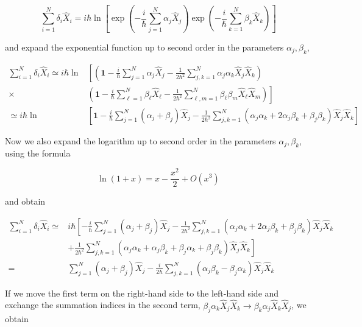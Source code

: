 \documentclass[10pt, letterpaper]{article}
\begin{document}
$$
\sum_{i=1}^{N} \delta_{i} \hat{X}_{i}=i \hbar \ln \left[\exp \left(-\frac{i}{\hbar} \sum_{j=1}^{N} \alpha_{j} \hat{X}_{j}\right) \exp \left(-\frac{i}{\hbar} \sum_{k=1}^{N} \beta_{k} \hat{X}_{k}\right)\right]
$$

and expand the exponential function up to second order in the parameters $\alpha_{j}, \beta_{k}$,

$$
\begin{aligned}
\sum_{i=1}^{N} \delta_{i} \hat{X}_{i} \simeq i \hbar \ln & {\left[\left(\mathbf{1}-\frac{i}{\hbar} \sum_{j=1}^{N} \alpha_{j} \hat{X}_{j}-\frac{1}{2 \hbar^{2}} \sum_{j, k=1}^{N} \alpha_{j} \alpha_{k} \hat{X}_{j} \hat{X}_{k}\right)\right.} \\
\times & \left.\left(\mathbf{1}-\frac{i}{\hbar} \sum_{\ell=1}^{N} \beta_{\ell} \hat{X}_{\ell}-\frac{1}{2 \hbar^{2}} \sum_{\ell, m=1}^{N} \beta_{\ell} \beta_{m} \hat{X}_{\ell} \hat{X}_{m}\right)\right] \\
\simeq i \hbar \ln & {\left[\mathbf{1}-\frac{i}{\hbar} \sum_{j=1}^{N}\left(\alpha_{j}+\beta_{j}\right) \hat{X}_{j}-\frac{1}{2 \hbar^{2}} \sum_{j, k=1}^{N}\left(\alpha_{j} \alpha_{k}+2 \alpha_{j} \beta_{k}+\beta_{j} \beta_{k}\right) \hat{X}_{j} \hat{X}_{k}\right] }
\end{aligned}
$$

Now we also expand the logarithm up to second order in the parameters $\alpha_{j}, \beta_{k}$, using the formula

$$
\ln (1+x)=x-\frac{x^{2}}{2}+O\left(x^{3}\right)
$$

and obtain

$$
\begin{aligned}
\sum_{i=1}^{N} \delta_{i} \hat{X}_{i} \simeq & i \hbar\left[-\frac{i}{\hbar} \sum_{j=1}^{N}\left(\alpha_{j}+\beta_{j}\right) \hat{X}_{j}-\frac{1}{2 \hbar^{2}} \sum_{j, k=1}^{N}\left(\alpha_{j} \alpha_{k}+2 \alpha_{j} \beta_{k}+\beta_{j} \beta_{k}\right) \hat{X}_{j} \hat{X}_{k}\right. \\
& \left.+\frac{1}{2 \hbar^{2}} \sum_{j, k=1}^{N}\left(\alpha_{j} \alpha_{k}+\alpha_{j} \beta_{k}+\beta_{j} \alpha_{k}+\beta_{j} \beta_{k}\right) \hat{X}_{j} \hat{X}_{k}\right] \\
= & \sum_{j=1}^{N}\left(\alpha_{j}+\beta_{j}\right) \hat{X}_{j}-\frac{i}{2 \hbar} \sum_{j, k=1}^{N}\left(\alpha_{j} \beta_{k}-\beta_{j} \alpha_{k}\right) \hat{X}_{j} \hat{X}_{k}
\end{aligned}
$$

If we move the first term on the right-hand side to the left-hand side and exchange the summation indices in the second term, $\beta_{j} \alpha_{k} \hat{X}_{j} \hat{X}_{k} \rightarrow \beta_{k} \alpha_{j} \hat{X}_{k} \hat{X}_{j}$, we obtain
\end{document}
